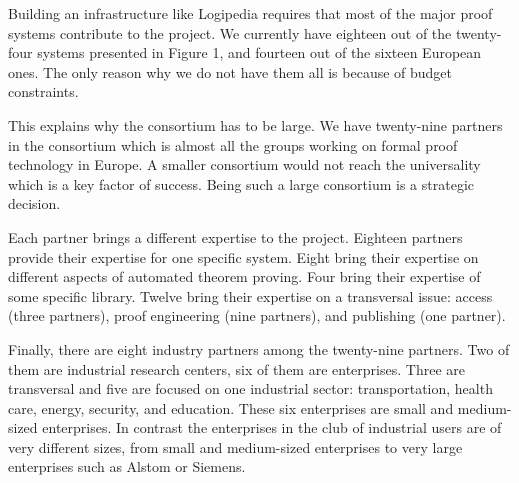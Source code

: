 Building an infrastructure like Logipedia requires that most of the
major proof systems contribute to the project. We currently have eighteen out of
the twenty-four systems presented in Figure 1, and fourteen out of the
sixteen European ones.  The only reason why we do not have them all is
because of budget constraints.

This explains why the consortium has to be large.  We have twenty-nine
partners in the consortium which is almost all the groups working on
formal proof technology in Europe.  A smaller consortium would not
reach the universality which is a key factor of success.  Being such a
large consortium is a strategic decision.

Each partner brings a different expertise to the project.  Eighteen
partners provide their expertise for one specific system.  Eight bring
their expertise on different aspects of automated theorem
proving. Four bring their expertise of some specific library. Twelve
bring their expertise on a transversal issue: access (three partners),
proof engineering (nine partners), and publishing (one partner).

Finally, there are eight industry partners among the twenty-nine partners.
Two of them are industrial research centers, six of them are enterprises.
Three are transversal and five are
focused on one industrial sector: transportation, health care, energy,
security, and education. These six enterprises are small and
medium-sized enterprises. In contrast the enterprises in the club of
industrial users are of very different sizes, from small and medium-sized
enterprises to very large enterprises such as Alstom or Siemens.

